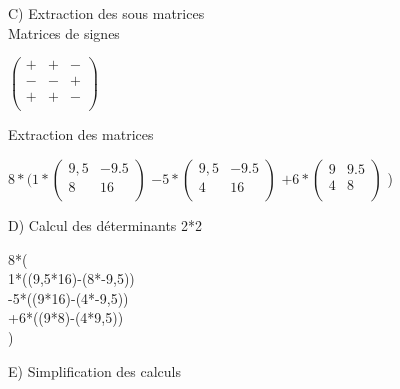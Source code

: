 C) Extraction des sous matrices \\

\vspace{5mm} %
Matrices de signes \\

\vspace{5mm} %

$
\begin{pmatrix}
  + & + & - \\
  - & - & + \\
  + & + & - \\
\end{pmatrix}
$


\vspace{10mm} %
Extraction des matrices \\
\vspace{5mm} %

$
8*(
  1*
  \begin{pmatrix}
    9,5 & -9.5 \\
    8 & 16 \\
  \end{pmatrix}
  $
  $
  -5*
  \begin{pmatrix}
    9,5 & -9.5 \\
    4 & 16 \\
  \end{pmatrix}
  $
  $
  +6*
  \begin{pmatrix}
    9 & 9.5 \\
    4 & 8 \\
  \end{pmatrix}
  $
)

\newpage

D) Calcul des déterminants 2*2


\vspace{5mm} %

8*(\\

1*((9,5*16)-(8*-9,5))\\

-5*((9*16)-(4*-9,5))\\

+6*((9*8)-(4*9,5))\\

)

\vspace{10mm} %

E) Simplification des calculs

